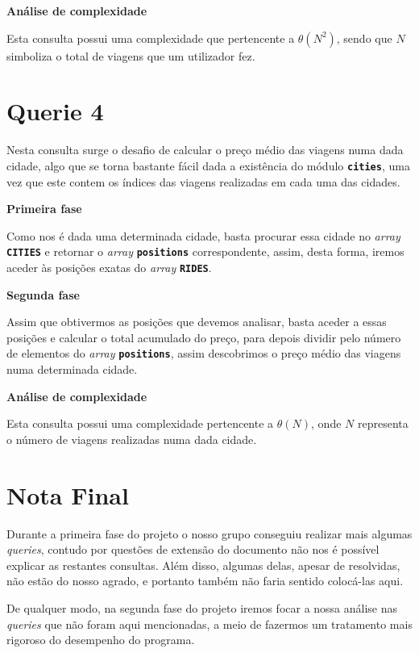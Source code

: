 \documentclass[12pt,a4paper]{report}
\begin{document}
\normalsize\textbf{Análise de complexidade }{\titlerule[0.5pt]}

Esta consulta possui uma complexidade que pertencente a \(\theta(N^2)\), sendo que \(N\) simboliza o total de viagens que um utilizador fez. 


\section{Querie 4}

Nesta consulta surge o desafio de calcular o preço médio das viagens numa dada cidade, algo que se torna bastante fácil dada a existência do módulo \textbf{\small\texttt{cities}}, uma vez que este contem os índices das viagens realizadas em cada uma das cidades.

\normalsize\textbf{Primeira fase }{\titlerule[0.5pt]}

Como nos é dada uma determinada cidade, basta procurar essa cidade no \textit{array} \textbf{\small\texttt{CITIES}} e retornar o \textit{array} \textbf{\small\texttt{positions}} correspondente, assim, desta forma, iremos aceder às posições exatas do \textit{array} \textbf{\small\texttt{RIDES}}.

\normalsize\textbf{Segunda fase }{\titlerule[0.5pt]}

Assim que obtivermos as posições que devemos analisar, basta aceder a essas posições e calcular o total acumulado do preço, para depois dividir pelo número de elementos do \textit{array} \textbf{\small\texttt{positions}}, assim descobrimos o preço médio das viagens numa determinada cidade.

\normalsize\textbf{Análise de complexidade }{\titlerule[0.5pt]}

Esta consulta possui uma complexidade pertencente a \(\theta(N)\), onde \(N\) representa o número de viagens realizadas numa dada cidade.

\section{Nota Final}

Durante a primeira fase do projeto o nosso grupo conseguiu realizar mais algumas \textit{queries}, contudo por questões de extensão do documento não nos é possível explicar as restantes consultas. Além disso, algumas delas, apesar de resolvidas, não estão do nosso agrado, e portanto também não faria sentido colocá-las aqui.

De qualquer modo, na segunda fase do projeto iremos focar a nossa análise nas \textit{queries} que não foram aqui mencionadas, a meio de fazermos um tratamento mais rigoroso do desempenho do programa. 
\end{document}
